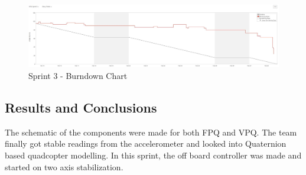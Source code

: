 \begin{figure}[h]
        \centering
        \includegraphics[width = 1\textwidth]{VAPIQ-PICTURES/BDSprint3}
        \caption{Sprint 3 - Burndown Chart}
        \label{fig:bds3}
    \end{figure}
  

\subsection{Results and Conclusions}

The schematic of the components were made for both FPQ and VPQ. The team finally got stable readings from the accelerometer and looked into Quaternion based quadcopter modelling. In this sprint, the off board controller was made and started on two axis stabilization.

